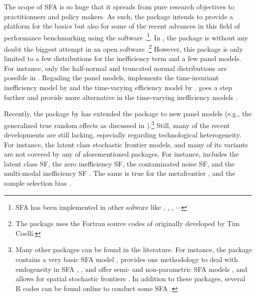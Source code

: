\documentclass[nojss]{jss}
\begin{document}
The scope of SFA is so huge that it spreads from pure research objectives to 
practitionners and policy makers. As such, the  package intends to 
provide a platform for the basics but also for some of the recent advances in 
this field of performance benchmarking using the software 
.\footnote{SFA has been implemented in other sofware like 
, , , $\cdots$}. In , 
the package  is without any doubt the biggest attempt in 
an open software \citep{frontier}.\footnote{The package  uses the 
Fortran source codes of  originally developed by Tim 
Coelli.} However, this package is only limited to a few distributions for the 
inefficiency term and a few panel models. For instance, only the half-normal and
truncated normal distributions are possible in . Regading the panel
models,  implements the time-invariant inefficiency model by 
\citet{pl81} and the time-varying efficiency model by \citet{batco92}.  
goes a step further and provide more alternative in the time-varying inefficiency
models \citep{kum90, batco92, lees93, cue00, cue02, feng09, kw05, al06}.

Recently, the package  by \citet{npsf} has extended the 
package to new panel models (e.g., the generalized true random effects as 
discussed in \citet{colomb14, klh14, tk14}).\footnote{Many other packages can be
found in the literature. For instance, the  package contains 
a very basic SFA model \citep{bench},  provides one methodology to 
deal with endogeneity in SFA \citep{sfadv}, , and  offer semi- and 
non-parametric SFA models \citep{semsfa, dsfa}, and  allows for spatial 
stochastic frontiers \citep{ssfa}. In addition to these packages, several R codes can be found
online to conduct some SFA \citep{si20, si22, nguyen22}.} Still, many 
of the recent developments are still lacking, especially regarding technological
heterogeneity. For instance, the latent class stochastic frontier models, and 
many of its variants are not covered by any of aforementioned packages. For instance,
 includes the latent class SF, the zero inefficiency SF, the 
contaminated noise SF, and the multi-modal inefficiency SF \citep{orea04, 
greene05, kum13, rho15, wheat19}. The same is true for the metafrontier 
\citep{batt04, huang14, am17}, and the sample selection bias 
\citep{greene10}. 
\end{document}
